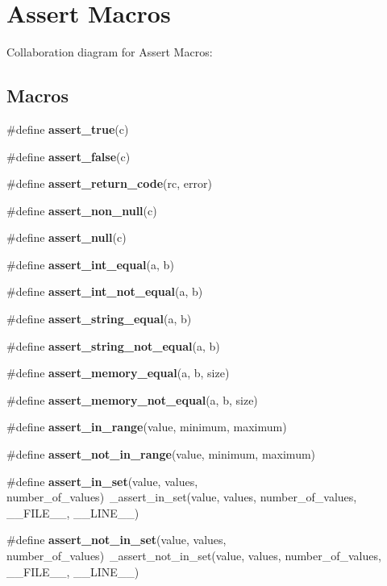 \hypertarget{group__cmocka__asserts}{}\section{Assert Macros}
\label{group__cmocka__asserts}
Collaboration diagram for Assert Macros\+:
\subsection*{Macros}
\begin{DoxyCompactItemize}
\item 
\#define {\bfseries assert\+\_\+true}(c)
\item 
\#define {\bfseries assert\+\_\+false}(c)
\item 
\#define {\bfseries assert\+\_\+return\+\_\+code}(rc,  error)
\item 
\#define {\bfseries assert\+\_\+non\+\_\+null}(c)
\item 
\#define {\bfseries assert\+\_\+null}(c)
\item 
\#define {\bfseries assert\+\_\+int\+\_\+equal}(a,  b)
\item 
\#define {\bfseries assert\+\_\+int\+\_\+not\+\_\+equal}(a,  b)
\item 
\#define {\bfseries assert\+\_\+string\+\_\+equal}(a,  b)
\item 
\#define {\bfseries assert\+\_\+string\+\_\+not\+\_\+equal}(a,  b)
\item 
\#define {\bfseries assert\+\_\+memory\+\_\+equal}(a,  b,  size)
\item 
\#define {\bfseries assert\+\_\+memory\+\_\+not\+\_\+equal}(a,  b,  size)
\item 
\#define {\bfseries assert\+\_\+in\+\_\+range}(value,  minimum,  maximum)
\item 
\#define {\bfseries assert\+\_\+not\+\_\+in\+\_\+range}(value,  minimum,  maximum)
\item 
\mbox{\label{group__cmocka__asserts_ga7df96aa5f5f895f35cc2f84411d643b0}} 
\#define {\bfseries assert\+\_\+in\+\_\+set}(value,  values,  number\+\_\+of\+\_\+values)~\+\_\+assert\+\_\+in\+\_\+set(value, values, number\+\_\+of\+\_\+values, \+\_\+\+\_\+\+F\+I\+L\+E\+\_\+\+\_\+, \+\_\+\+\_\+\+L\+I\+N\+E\+\_\+\+\_\+)
\item 
\mbox{\label{group__cmocka__asserts_ga831c33b0d53230e9f5542a2088e3312d}} 
\#define {\bfseries assert\+\_\+not\+\_\+in\+\_\+set}(value,  values,  number\+\_\+of\+\_\+values)~\+\_\+assert\+\_\+not\+\_\+in\+\_\+set(value, values, number\+\_\+of\+\_\+values, \+\_\+\+\_\+\+F\+I\+L\+E\+\_\+\+\_\+, \+\_\+\+\_\+\+L\+I\+N\+E\+\_\+\+\_\+)
\end{DoxyCompactItemize}


